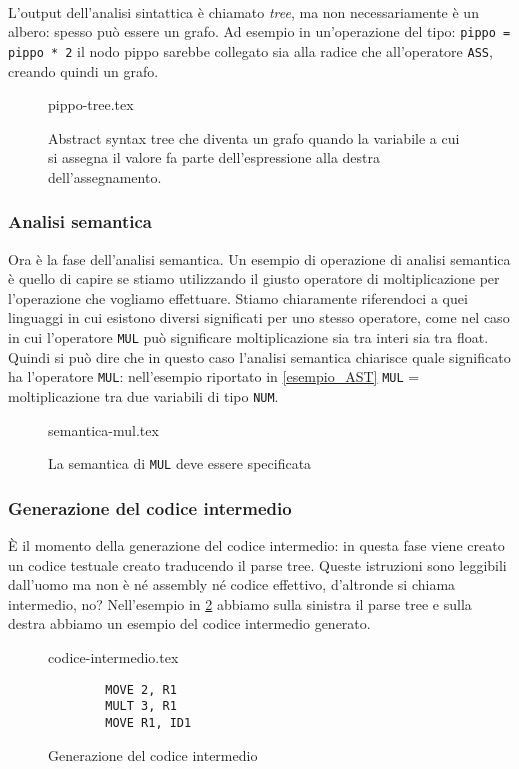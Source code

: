 \documentclass[class=book, crop=false, oneside, 12pt]{standalone}
\begin{document}
\paragraph{}
L’output dell’analisi sintattica è chiamato \emph{tree}, ma non necessariamente è un albero: spesso può essere un grafo. Ad esempio in un’operazione del tipo:
\texttt{pippo = pippo * 2}
il nodo pippo sarebbe collegato sia alla radice che all’operatore \texttt{ASS}, creando quindi un grafo.
\begin{figure}[H]
	\centering
	{pippo-tree.tex}
	\caption{Abstract syntax tree che diventa un grafo quando la variabile a cui si assegna il valore fa parte dell'espressione alla destra dell'assegnamento.}
	\label{esempio_pippo}
\end{figure}

\subsubsection{Analisi semantica}
Ora è la fase dell’analisi semantica. Un esempio di operazione di analisi semantica è quello di capire se stiamo utilizzando il giusto operatore di moltiplicazione per l’operazione che vogliamo effettuare. Stiamo chiaramente riferendoci a quei linguaggi in cui esistono diversi significati per uno stesso operatore, come nel caso in cui l'operatore \texttt{MUL} può significare moltiplicazione sia tra interi sia tra float. Quindi si può dire che in questo caso l’analisi semantica chiarisce quale significato ha l’operatore \texttt{MUL}: nell’esempio riportato in \ref{esempio_AST} \texttt{MUL} = moltiplicazione tra due variabili di tipo \texttt{NUM}.
\begin{figure}[H]
	\centering
	{semantica-mul.tex}
	\caption{La semantica di \texttt{MUL} deve essere specificata}
\end{figure}

\subsubsection{Generazione del codice intermedio}
È il momento della generazione del codice intermedio: in questa fase viene creato un codice testuale creato traducendo il parse tree. Queste istruzioni sono leggibili dall’uomo ma non è né assembly né codice effettivo, d’altronde si chiama intermedio, no? Nell'esempio in \ref{codice_intermedio} abbiamo sulla sinistra il parse tree e sulla destra abbiamo un esempio del codice intermedio generato.
\begin{figure}[H]
    \begin{minipage}{.5\textwidth}
		\raggedleft
		{codice-intermedio.tex}
	\end{minipage}
	\begin{minipage}{.5\textwidth}
		\raggedright
		\begin{verbatim}
		MOVE 2, R1
		MULT 3, R1
		MOVE R1, ID1
		\end{verbatim}
	\end{minipage}
	\caption{Generazione del codice intermedio}
	\label{codice_intermedio}
\end{figure}
\end{document}
